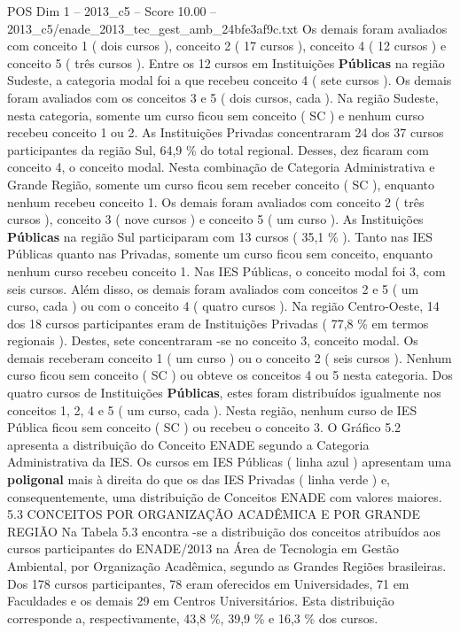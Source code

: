 \begin{textsample}{POS Dim 1 – 2013\_c5 – Score 10.00 – 2013\_c5/enade\_2013\_tec\_gest\_amb\_24bfe3af9c.txt}
Os demais foram avaliados com conceito 1 ( dois cursos ), conceito 2 ( 17 cursos ), conceito 4 ( 12 cursos ) e conceito 5 ( três cursos ).
Entre os 12 cursos em Instituições \textbf{Públicas} na região Sudeste, a categoria modal foi a que recebeu conceito 4 ( sete cursos ).
Os demais foram avaliados com os conceitos 3 e 5 ( dois cursos, cada ).
Na região Sudeste, nesta categoria, somente um curso ficou sem conceito ( SC ) e nenhum curso recebeu conceito 1 ou 2.
As Instituições Privadas concentraram 24 dos 37 cursos participantes da região Sul, 64,9 \% do total regional.
Desses, dez ficaram com conceito 4, o conceito modal.
Nesta combinação de Categoria Administrativa e Grande Região, somente um curso ficou sem receber conceito ( SC ), enquanto nenhum recebeu conceito 1.
Os demais foram avaliados com conceito 2 ( três cursos ), conceito 3 ( nove cursos ) e conceito 5 ( um curso ).
As Instituições \textbf{Públicas} na região Sul participaram com 13 cursos ( 35,1 \% ).
Tanto nas IES Públicas quanto nas Privadas, somente um curso ficou sem conceito, enquanto nenhum curso recebeu conceito 1.
Nas IES Públicas, o conceito modal foi 3, com seis cursos.
Além disso, os demais foram avaliados com conceitos 2 e 5 ( um curso, cada ) ou com o conceito 4 ( quatro cursos ).
Na região Centro-Oeste, 14 dos 18 cursos participantes eram de Instituições Privadas ( 77,8 \% em termos regionais ).
Destes, sete concentraram -se no conceito 3, conceito modal.
Os demais receberam conceito 1 ( um curso ) ou o conceito 2 ( seis cursos ).
Nenhum curso ficou sem conceito ( SC ) ou obteve os conceitos 4 ou 5 nesta categoria.
Dos quatro cursos de Instituições \textbf{Públicas}, estes foram distribuídos igualmente nos conceitos 1, 2, 4 e 5 ( um curso, cada ).
Nesta região, nenhum curso de IES Pública ficou sem conceito ( SC ) ou recebeu o conceito 3.
O Gráfico 5.2 apresenta a distribuição do Conceito ENADE segundo a Categoria Administrativa da IES.
Os cursos em IES Públicas ( linha azul ) apresentam uma \textbf{poligonal} mais à direita do que os das IES Privadas ( linha verde ) e, consequentemente, uma distribuição de Conceitos ENADE com valores maiores. 5.3 CONCEITOS POR ORGANIZAÇÃO ACADÊMICA E POR GRANDE REGIÃO Na Tabela 5.3 encontra -se a distribuição dos conceitos atribuídos aos cursos participantes do ENADE/2013 na Área de Tecnologia em Gestão Ambiental, por Organização Acadêmica, segundo as Grandes Regiões brasileiras.
Dos 178 cursos participantes, 78 eram oferecidos em Universidades, 71 em Faculdades e os demais 29 em Centros Universitários.
Esta distribuição corresponde a, respectivamente, 43,8 \%, 39,9 \% e 16,3 \% dos cursos.

\end{textsample}
